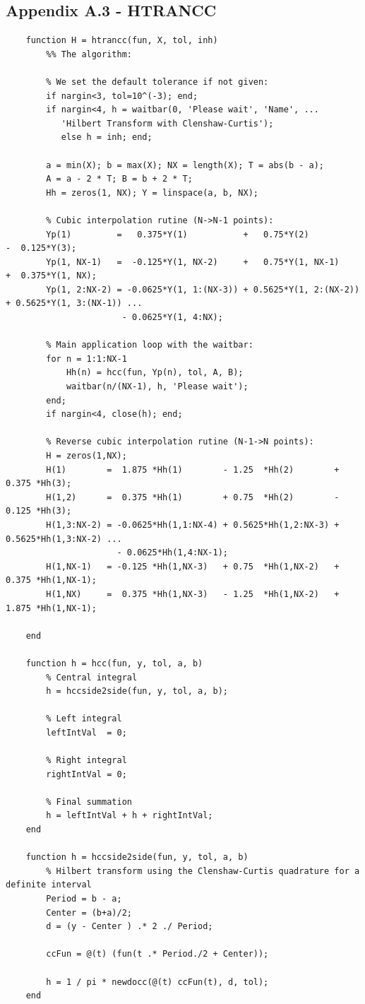 \documentclass[12pt,twoside,a4paper]{article}
\numberwithin{equation}{subsection}
\numberwithin{figure}{subsection}
\begin{document}
\subsection*{Appendix A.3 - HTRANCC}
\begin{lstlisting}
	function H = htrancc(fun, X, tol, inh)
	    %% The algorithm:
	    
	    % We set the default tolerance if not given:
	    if nargin<3, tol=10^(-3); end;
	    if nargin<4, h = waitbar(0, 'Please wait', 'Name', ...
	       'Hilbert Transform with Clenshaw-Curtis'); 
	       else h = inh; end;
	    
	    a = min(X); b = max(X); NX = length(X); T = abs(b - a);
	    A = a - 2 * T; B = b + 2 * T;
	    Hh = zeros(1, NX); Y = linspace(a, b, NX);
	    
	    % Cubic interpolation rutine (N->N-1 points):
	    Yp(1)         =   0.375*Y(1)           +   0.75*Y(2)           -  0.125*Y(3);
	    Yp(1, NX-1)   =  -0.125*Y(1, NX-2)     +   0.75*Y(1, NX-1)     +  0.375*Y(1, NX);
	    Yp(1, 2:NX-2) = -0.0625*Y(1, 1:(NX-3)) + 0.5625*Y(1, 2:(NX-2)) + 0.5625*Y(1, 3:(NX-1)) ...
	                   - 0.0625*Y(1, 4:NX);
	    
	    % Main application loop with the waitbar:
	    for n = 1:1:NX-1
	        Hh(n) = hcc(fun, Yp(n), tol, A, B); 
	        waitbar(n/(NX-1), h, 'Please wait');
	    end;
	    if nargin<4, close(h); end;
	    
	    % Reverse cubic interpolation rutine (N-1->N points):
	    H = zeros(1,NX);
	    H(1)        =  1.875 *Hh(1)        - 1.25  *Hh(2)        + 0.375 *Hh(3);
	    H(1,2)      =  0.375 *Hh(1)        + 0.75  *Hh(2)        - 0.125 *Hh(3);
	    H(1,3:NX-2) = -0.0625*Hh(1,1:NX-4) + 0.5625*Hh(1,2:NX-3) + 0.5625*Hh(1,3:NX-2) ...
	                  - 0.0625*Hh(1,4:NX-1);
	    H(1,NX-1)   = -0.125 *Hh(1,NX-3)   + 0.75  *Hh(1,NX-2)   + 0.375 *Hh(1,NX-1);
	    H(1,NX)     =  0.375 *Hh(1,NX-3)   - 1.25  *Hh(1,NX-2)   + 1.875 *Hh(1,NX-1);
	
	end
	
	function h = hcc(fun, y, tol, a, b)
	    % Central integral
	    h = hccside2side(fun, y, tol, a, b);
	    
	    % Left integral
	    leftIntVal  = 0;
	    
	    % Right integral
	    rightIntVal = 0;
	    
	    % Final summation
	    h = leftIntVal + h + rightIntVal;
	end
	
	function h = hccside2side(fun, y, tol, a, b)
	    % Hilbert transform using the Clenshaw-Curtis quadrature for a definite interval
	    Period = b - a;
	    Center = (b+a)/2;
	    d = (y - Center ) .* 2 ./ Period;
	   
	    ccFun = @(t) (fun(t .* Period./2 + Center));
	    
	    h = 1 / pi * newdocc(@(t) ccFun(t), d, tol);
	end
\end{lstlisting}
\end{document}
